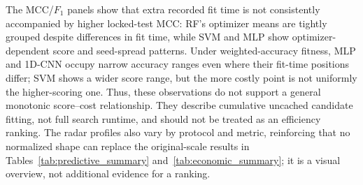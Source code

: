 The MCC/$F_1$ panels show that extra recorded fit time is not consistently accompanied by higher locked-test MCC: RF's optimizer means are tightly grouped despite differences in fit time, while SVM and MLP show optimizer-dependent score and seed-spread patterns. Under weighted-accuracy fitness, MLP and 1D-CNN occupy narrow accuracy ranges even where their fit-time positions differ; SVM shows a wider score range, but the more costly point is not uniformly the higher-scoring one. Thus, these observations do not support a general monotonic score--cost relationship. They describe cumulative uncached candidate fitting, not full search runtime, and should not be treated as an efficiency ranking. The radar profiles also vary by protocol and metric, reinforcing that no normalized shape can replace the original-scale results in Tables~\ref{tab:predictive_summary} and~\ref{tab:economic_summary}; it is a visual overview, not additional evidence for a ranking.
